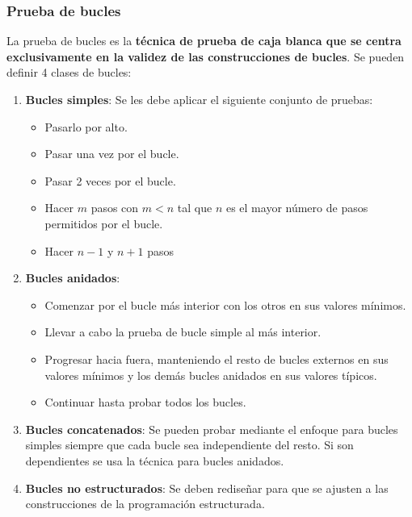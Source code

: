 \subsubsection{Prueba de bucles}
La prueba de bucles es la \textbf{técnica de prueba de caja blanca que se centra exclusivamente en la validez de las construcciones de bucles}. Se pueden definir 4 clases de bucles:
\begin{enumerate}
    \item \textbf{Bucles simples}: Se les debe aplicar el siguiente conjunto de pruebas:
    \begin{itemize}
        \item Pasarlo por alto.
        \item Pasar una vez por el bucle.
        \item Pasar 2 veces por el bucle.
        \item Hacer $m$ pasos con $m < n$ tal que $n$ es el mayor número de pasos permitidos por el bucle.
        \item Hacer $n-1$ y $n+1$ pasos
    \end{itemize}
    \item \textbf{Bucles anidados}:
    \begin{itemize}
        \item Comenzar por el bucle más interior con los otros en sus valores mínimos.
        \item Llevar a cabo la prueba de bucle simple al más interior.
        \item Progresar hacia fuera, manteniendo el resto de bucles externos en sus valores mínimos y los demás bucles anidados en sus valores típicos.
        \item Continuar hasta probar todos los bucles.
    \end{itemize}
    \item \textbf{Bucles concatenados}: Se pueden probar mediante el enfoque para bucles simples siempre que cada bucle sea independiente del resto. Si son dependientes se usa la técnica para bucles anidados.
    \item \textbf{Bucles no estructurados}: Se deben rediseñar para que se ajusten a las construcciones de la programación estructurada.
\end{enumerate}



